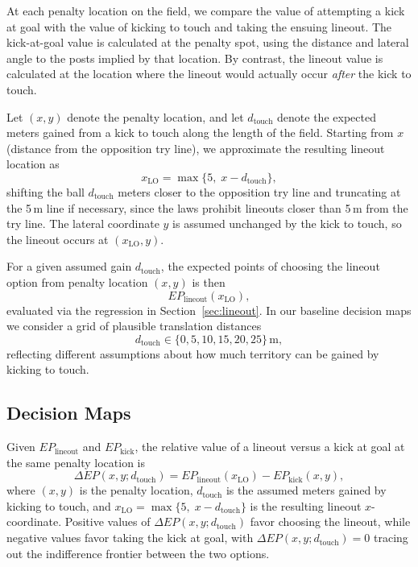 \documentclass[12pt]{article}
\begin{document}
At each penalty location on the field, we compare the value of attempting a kick at goal with the value of kicking to touch and taking the ensuing lineout. The kick-at-goal value is calculated at the penalty spot, using the distance and lateral angle to the posts implied by that location. By contrast, the lineout value is calculated at the location where the lineout would actually occur \emph{after} the kick to touch.

Let $(x, y)$ denote the penalty location, and let $d_{\text{touch}}$ denote the expected meters gained from a kick to touch along the length of the field. Starting from $x$ (distance from the opposition try line), we approximate the resulting lineout location as
\[
x_{\text{LO}} = \max\{5,\; x - d_{\text{touch}}\},
\]
shifting the ball $d_{\text{touch}}$ meters closer to the opposition try line and truncating at the 5\,m line if necessary, since the laws prohibit lineouts closer than 5\,m from the try line. The lateral coordinate $y$ is assumed unchanged by the kick to touch, so the lineout occurs at $(x_{\text{LO}}, y)$.

For a given assumed gain $d_{\text{touch}}$, the expected points of choosing the lineout option from penalty location $(x, y)$ is then
\[
EP_{\text{lineout}}(x_{\text{LO}}),
\]
evaluated via the regression in Section~\ref{sec:lineout}. In our baseline decision maps we consider a grid of plausible translation distances
\[
d_{\text{touch}} \in \{0, 5, 10, 15, 20, 25\}\,\text{m},
\]
reflecting different assumptions about how much territory can be gained by kicking to touch.

\subsection{Decision Maps}

Given $EP_{\text{lineout}}$ and $EP_{\text{kick}}$, the relative value of a lineout versus a kick at goal at the same penalty location is
\[
\Delta EP(x, y; d_{\text{touch}}) 
  = EP_{\text{lineout}}(x_{\text{LO}}) - EP_{\text{kick}}(x, y),
\]
where $(x, y)$ is the penalty location, $d_{\text{touch}}$ is the assumed meters gained by kicking to touch, and $x_{\text{LO}} = \max\{5,\; x - d_{\text{touch}}\}$ is the resulting lineout $x$-coordinate. Positive values of $\Delta EP(x, y; d_{\text{touch}})$ favor choosing the lineout, while negative values favor taking the kick at goal, with $\Delta EP(x, y; d_{\text{touch}}) = 0$ tracing out the indifference frontier between the two options.
\end{document}

